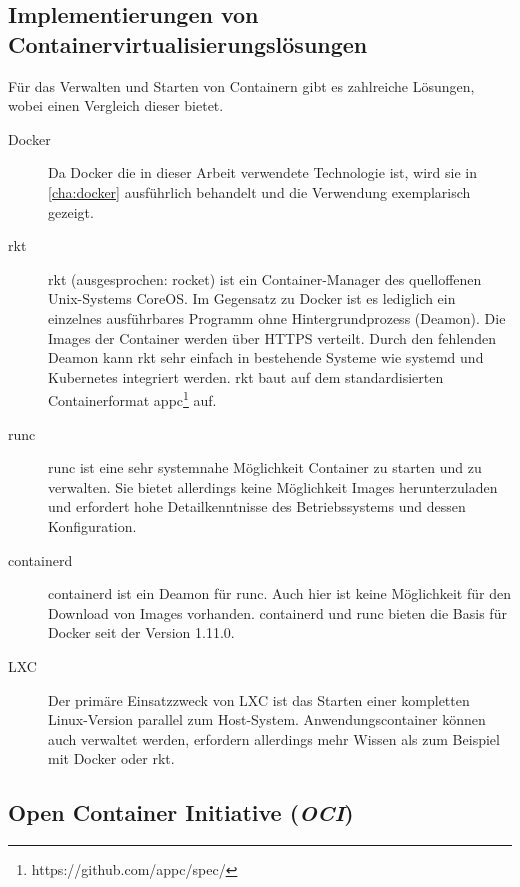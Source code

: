 
\subsection{Implementierungen von Containervirtualisierungslösungen}
Für das Verwalten und Starten von Containern gibt es zahlreiche Lösungen, wobei \autocite{rkt-comparison:online} einen Vergleich dieser bietet.
\label{sec:container-solutions}
\begin{description}
    \item [Docker] Da Docker die in dieser Arbeit verwendete Technologie ist, wird sie in \cref{cha:docker} ausführlich behandelt und die Verwendung exemplarisch gezeigt.
    \item [rkt] rkt (ausgesprochen: rocket) ist ein Container-Manager des quelloffenen Unix-Systems CoreOS. Im Gegensatz zu Docker ist es lediglich ein einzelnes ausführbares Programm ohne Hintergrundprozess (Deamon). Die Images der Container werden über HTTPS verteilt. Durch den fehlenden Deamon kann rkt sehr einfach in bestehende Systeme wie systemd und Kubernetes integriert werden. rkt baut auf dem standardisierten Containerformat appc\footnote{https://github.com/appc/spec/} auf.
    \item [runc] runc ist eine sehr systemnahe Möglichkeit Container zu starten und zu verwalten. Sie bietet allerdings keine Möglichkeit Images herunterzuladen und erfordert hohe Detailkenntnisse des Betriebssystems und dessen Konfiguration.
    \item [containerd] containerd ist ein Deamon für runc. Auch hier ist keine Möglichkeit für den Download von Images vorhanden. containerd und runc bieten die Basis für Docker seit der Version 1.11.0.
    \item [LXC] Der primäre Einsatzzweck von LXC ist das Starten einer kompletten Linux-Version parallel zum Host-System. Anwendungscontainer können auch verwaltet werden, erfordern allerdings mehr Wissen als zum Beispiel mit Docker oder rkt.
\end{description}
\subsection{Open Container Initiative (\emph{OCI})}
\label{sec:open-container-initiative}
